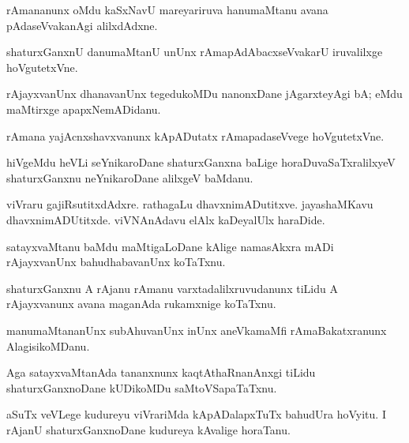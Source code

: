 \documentclass{article}
\begin{document}
\begin{mn}%
rAmananunx oMdu kaSxNavU mareyariruva hanumaMtanu avana pAdaseVvakanAgi alilxdAdxne.
\end{mn}

\begin{mn}%
shaturxGanxnU danumaMtanU unUnx rAmapAdAbacxseVvakarU iruvalilxge hoVgutetxVne.
\end{mn}

\begin{mn}%
rAjayxvanUnx dhanavanUnx tegedukoMDu nanonxDane jAgarxteyAgi bA; eMdu maMtirxge 
apapxNemADidanu.
\end{mn}

\begin{mn}%
rAmana yajAcnxshavxvanunx kApADutatx rAmapadaseVvege hoVgutetxVne.
\end{mn}

\begin{mn}%
hiVgeMdu heVLi seYnikaroDane shaturxGanxna baLige horaDuvaSaTxralilxyeV shaturxGanxnu
neYnikaroDane alilxgeV baMdanu. 
\end{mn}

\begin{mn}%
viVraru gajiRsutitxdAdxre. rathagaLu dhavxnimADutitxve. jayashaMKavu dhavxnimADUtitxde. 
viVNAnAdavu elAlx kaDeyalUlx haraDide.
\end{mn}

\begin{mn}%
satayxvaMtanu baMdu maMtigaLoDane kAlige namasAkxra mADi rAjayxvanUnx bahudhabavanUnx 
koTaTxnu.
\end{mn}

\begin{mn}%
shaturxGanxnu A rAjanu rAmanu varxtadalilxruvudanunx tiLidu A rAjayxvanunx avana maganAda 
rukamxnige koTaTxnu.
\end{mn}

\begin{mn}%
manumaMtananUnx subAhuvanUnx inUnx aneVkamaMfi rAmaBakatxranunx AlagisikoMDanu.
\end{mn}

\begin{mn}%
Aga satayxvaMtanAda tananxnunx  kaqtAthaRnanAnxgi tiLidu shaturxGanxnoDane kUDikoMDu 
saMtoVSapaTaTxnu.
\end{mn}

\begin{mn}%
aSuTx veVLege kudureyu viVrariMda kApADalapxTuTx bahudUra hoVyitu. I rAjanU 
shaturxGanxnoDane kudureya kAvalige horaTanu.
\end{mn}
\end{document}
